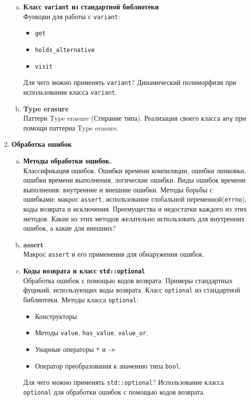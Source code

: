 \documentclass{article}
\begin{document}
\begin{enumerate}
\begin{enumerate}[a.]
\item \textbf{Класс \texttt{variant} из стандартной библиотеки}\\
Функции для работы с \texttt{variant}:
\begin{itemize}
\item \texttt{get}
\item \texttt{holds\_alternative}
\item \texttt{visit}
\end{itemize}
Для чего можно применять \texttt{variant}? Динамический полиморфизм при использовании класса \texttt{variant}.

\item \textbf{Type erasure}\\
Паттерн Type erasure (Стирание типа). Реализация своего класса \texttt{any} при помощи паттерна Type erasure.
\end{enumerate}


\newpage
\item \textbf{Обработка ошибок}
\begin{enumerate}[a.]
\item \textbf{Методы обработки ошибок.}\\
Классификация ошибок. Ошибки времени компиляции, ошибки линковки, ошибки времени выполнения, логические ошибки.
Виды ошибок времени выполнения: внутренние и внешние ошибки. Методы борьбы с ошибками: макрос \texttt{assert}, использование глобальной переменной(\texttt{errno}), коды возврата и исключения. Преемущества и недостатки каждого из этих методов. Какие из этих методов желательно использовать для внутренних ошибок, а какие для внешних?


\item \textbf{assert}\\
Макрос \texttt{assert} и его применения для обнаружения ошибок.

\item \textbf{Коды возврата и класс \texttt{std::optional}}\\
Обработка ошибок с помощью кодов возврата. Примеры стандартных фуцнкий, использующих коды возврата.
Класс \texttt{optional} из стандартной библиотеки.
Методы класса \texttt{optional}:
\begin{itemize}
\item Конструкторы
\item Методы \texttt{value}, \texttt{has\_value}, \texttt{value\_or}.
\item Унарные операторы \texttt{*} и \texttt{->}
\item Оператор преобразования к значению типа \texttt{bool}.
\end{itemize}
Для чего можно применять \texttt{std::optional}? Использование класса \texttt{optional} для обработки ошибок с помощью кодов возврата.



\end{enumerate}
\end{enumerate}
\end{document}
